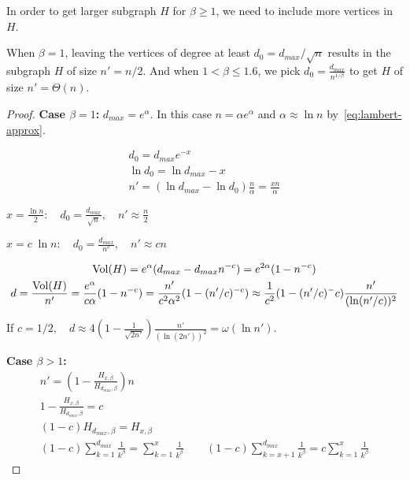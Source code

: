 In order to get larger subgraph $H$ for $\beta\geq 1$, we need to include more vertices in $H$.
\begin{lemma}
    \label{lem:powerlaw-coin-toss-size-vol-of-h-large}
    When $\beta=1$, leaving the vertices of degree at least $d_0=d_{max}/\sqrt{n}$ results in the subgraph $H$ of size $n'=n/2$.
    And when $1<\beta\leq 1.6$, we pick $d_0=\frac{d_{max}}{n^{1/\beta}}$ to get $H$ of size $n'=\Theta(n)$.
\end{lemma}

\begin{proof}
    \textbf{Case $\beta=1$:}
    $d_{max}=e^\alpha$. In this case $n=\alpha e^\alpha$
    and $\alpha\approx\ln n$ by~\eqref{eq:lambert-approx}.
    
    \begin{gather*}
        d_0=d_{max}e^{-x}\\
        \ln d_0=\ln d_{max}-x\\
        n'=(\ln d_{max}-\ln d_0)\frac{n}{\alpha}=\frac{xn}{\alpha}
    \end{gather*}

    $x=\frac{\ln n}{2}:\quad d_0=\frac{d_{max}}{\sqrt{n}},\quad n'\approx\frac{n}{2}$
    
    $x=c\;\ln n:\quad d_0=\frac{d_{max}}{n^c},\quad n'\approx cn$
    
    \begin{gather*}
        \Vol(H)=e^\alpha(d_{max}-d_{max}n^{-c})=e^{2\alpha}(1-n^{-c})\\
        d=\frac{\Vol(H)}{n'}=\frac{e^\alpha}{c\alpha}(1-n^{-c}) %
        =\frac{n'}{c^2\alpha^2}(1-(n'/c)^{-c})
        \approx\frac{1}{c^2}(1-(n'/c)^-c)\frac{n'}{(\ln (n'/c))^2}
    \end{gather*}
    
    If $c=1/2,\quad d\approx4\left(1-\frac{1}{\sqrt{2n'}}\right)\frac{n'}{(\ln (2n'))^2}=\omega(\ln n')$.
    
    \textbf{Case $\beta>1$:}
    \begin{gather*}
        n'=\left(1-\frac{H_{x,\beta}}{H_{d_{max},\beta}}\right)n\\
        1-\frac{H_{x,\beta}}{H_{d_{max},\beta}}=c\\
        (1-c)H_{d_{max},\beta}=H_{x,\beta}\\
        (1-c)\sum_{k=1}^{d_{max}}\frac{1}{k^\beta}=\sum_{k=1}^{x}\frac{1}{k^\beta}
        \qquad(1-c)\sum_{k=x+1}^{d_{max}}\frac{1}{k^\beta}=c\sum_{k=1}^{x}\frac{1}{k^\beta}
    \end{gather*}
    

\end{proof}
